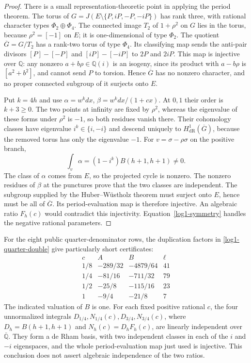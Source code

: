 \documentclass[11pt,a4paper]{article}
\theoremstyle{definition}
\theoremstyle{remark}
\numberwithin{equation}{section}
\begin{document}
\begin{proof}
There is a small representation-theoretic point in applying the period
theorem. The torus of $G=J(E\setminus\{P,iP,-P,-iP\})$ has rank three,
with rational character types $\Phi_2\oplus\Phi_4$. The connected image
$T_2$ of $1+\rho^2$ on $G$ lies in the torus, because $\rho^2=[-1]$
on $E$; it is one-dimensional of type $\Phi_2$. The quotient
$\overline G=G/T_2$ has a rank-two torus of type $\Phi_4$. Its
classifying map sends the anti-pair divisors
$[P]-[-P]$ and $[iP]-[-iP]$ to $2P$ and $2iP$.
This map is injective over $\mathbb Q$: any nonzero
$a+b\rho\in\mathbb Q(i)$ is an isogeny, since its product with
$a-b\rho$ is $[a^2+b^2]$, and cannot send $P$ to torsion.
Hence $\overline G$ has no nonzero character, and no proper connected
subgroup of it surjects onto $E$.

Put $k=4h$ and use $\alpha=w^kdx$, $\beta=w^kdx/(1+cx)$.
At $0,1$ their order is $k+3\ge0$. The two points at infinity are
fixed by $\rho^2$, whereas the eigenvalue of these forms under
$\rho^2$ is $-1$, so both residues vanish there. Their cohomology
classes have eigenvalue $i^k\in\{i,-i\}$ and descend uniquely to
$H^1_{\mathrm{dR}}(\overline G)$, because the removed torus has only
the eigenvalue $-1$. For $v=\sigma-\rho\sigma$ on the positive branch,
\[
 \int_v\alpha=(1-i^k)B(h+1,h+1)\ne0.
\]
The class of $\alpha$ comes from $E$, so the projected cycle is
nonzero. The nonzero residues of $\beta$ at the punctures prove that
the two classes are independent. The subgroup supplied by the
Huber--W\"ustholz theorem must surject onto $E$, hence must be all of
$\overline G$. Its period-evaluation map is therefore injective.
An algebraic ratio $F_h(c)$ would contradict this injectivity.
Equation~\eqref{log1-symmetry} handles the negative rational parameters.
\end{proof}

For the eight public quarter-denominator rows, the duplication factors
in \eqref{log1-quarter-double} give particularly short certificates:
\[
\begin{array}{c|c|c|c}
c&A&B&\ell\\\hline
1/8&-289/32&-4879/64&41\\
1/4&-81/16&-711/32&79\\
1/2&-25/8&-115/16&23\\
1&-9/4&-21/8&7
\end{array}
\]
The indicated valuation of $B$ is one. For each fixed positive rational
$c$, the four unnormalized integrals $D_{1/4},N_{1/4}(c),D_{3/4},N_{3/4}(c)$,
where $D_h=B(h+1,h+1)$ and $N_h(c)=D_hF_h(c)$, are linearly independent
over $\overline{\mathbb Q}$. They form a de Rham basis, with two
independent classes in each of the $i$ and $-i$ eigenspaces, and the
whole period-evaluation map just used is injective. This conclusion
does not assert algebraic independence of the two ratios.
\end{document}

